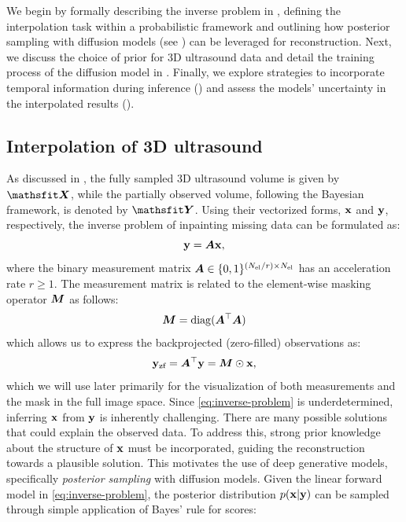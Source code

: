 \documentclass[journal,twoside,web,dvipsnames]{ieeecolor}          %
\begin{document}
We begin by formally describing the inverse problem in , defining the interpolation task within a probabilistic framework and outlining how posterior sampling with diffusion models (see ) can be leveraged for reconstruction. Next, we discuss the choice of prior for 3D ultrasound data and detail the training process of the diffusion model in . Finally, we explore strategies to incorporate temporal information during inference () and assess the models' uncertainty in the interpolated results ().

\subsection{Interpolation of 3D ultrasound}\label{sec:3d-interpolation}
As discussed in , the fully sampled 3D ultrasound volume is given by $\tX$, while the partially observed volume, following the Bayesian framework, is denoted by $\tY$. Using their vectorized forms, ${\mathbf{x}}$ and ${\mathbf{y}}$, respectively, the inverse problem of inpainting missing data can be formulated as:
\begin{equation}
    {\mathbf{y}} = {\bm{A}} {\mathbf{x}},
    \label{eq:inverse-problem}
\end{equation}
where the binary measurement matrix ${\bm{A}} \in \{0,1\}^{(N_\text{el} / r) \times N_\text{el}}$ has an acceleration rate $r\geq 1$. The measurement matrix is related to the element-wise masking operator ${\bm{M}}$ as follows:
\begin{equation}
    {\bm{M}} = \operatorname{diag}({\bm{A}}^\top{\bm{A}})
\end{equation}
which allows us to express the backprojected (zero-filled) observations as:
\begin{equation}
    {\mathbf{y}}_{\text{zf}} ={\bm{A}}^\top {\mathbf{y}} = {\bm{M}} \odot {\mathbf{x}},
    \label{eq:observation_zf}
\end{equation}
which we will use later primarily for the visualization of both measurements and the mask in the full image space.
Since \eqref{eq:inverse-problem} is underdetermined, inferring ${\mathbf{x}}$ from ${\mathbf{y}}$ is inherently challenging. There are many possible solutions that could explain the observed data. To address this, strong prior knowledge about the structure of ${\mathbf{x}}$ must be incorporated, guiding the reconstruction towards a plausible solution. This motivates the use of deep generative models, specifically \emph{posterior sampling} with diffusion models. Given the linear forward model in \eqref{eq:inverse-problem}, the posterior distribution $p({\mathbf{x}} | {\mathbf{y}})$ can be sampled through simple application of Bayes' rule for scores:
\end{document}
